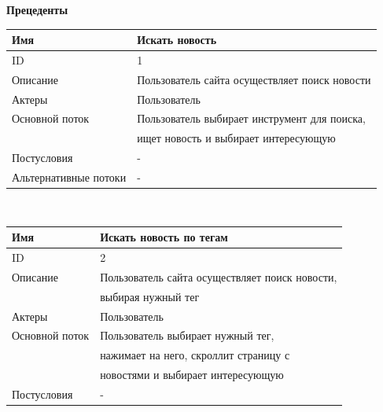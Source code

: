 \begin{center}
    \large
    \textbf{Прецеденты\\}
    \small
    \begin{tabular}{|l|l|}
        \hline
        Имя                   & Искать новость                                \\
        \hline
        ID                    & 1                                             \\
        \hline
        Описание              & Пользователь сайта осуществляет поиск новости \\
        \hline
        Актеры                & Пользователь                                  \\
        \hline
        Основной поток        & Пользователь выбирает инструмент для поиска,  \\
        & ищет новость и выбирает интересующую          \\
        \hline
        Постусловия           & -                                             \\
        \hline
        Альтернативные потоки & -                                             \\
        \hline
    \end{tabular}\\
    \vspace{0.5cm}
    \begin{tabular}{|l|l|}
        \hline
        Имя                   & Искать новость по тегам                        \\
        \hline
        ID                    & 2                                              \\
        \hline
        Описание              & Пользователь сайта осуществляет поиск новости, \\
        & выбирая нужный тег                             \\
        \hline
        Актеры                & Пользователь                                   \\
        \hline
        Основной поток        & Пользователь выбирает нужный тег,              \\
        & нажимает на него, скроллит страницу с          \\
        & новостями и выбирает интересующую              \\
        \hline
        Постусловия           & -                                              \\

\end{tabular}
\end{center}
